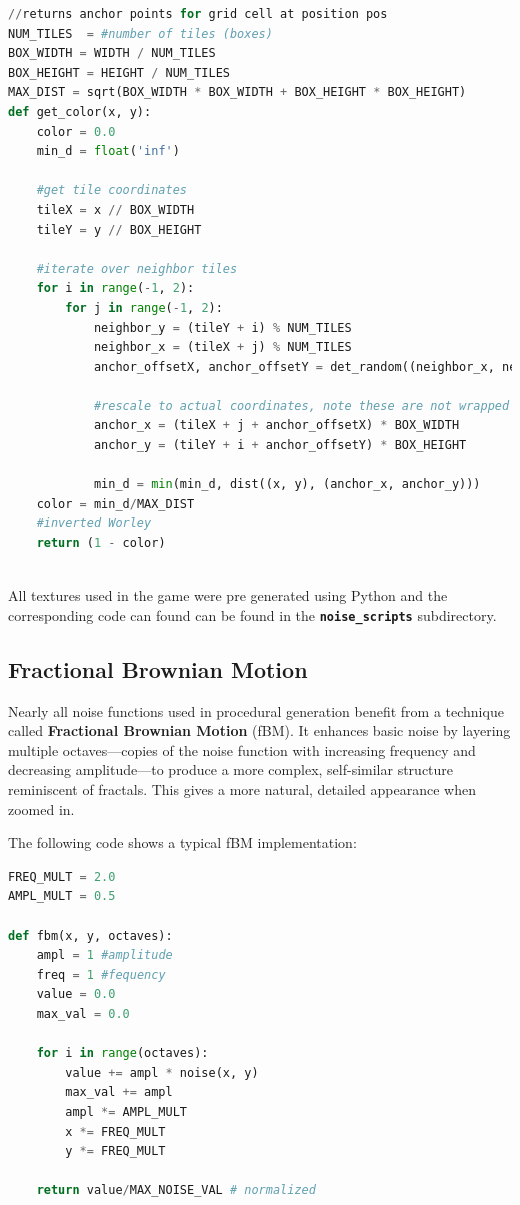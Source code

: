 \begin{lstlisting}[language=Python]
//returns anchor points for grid cell at position pos
NUM_TILES  = #number of tiles (boxes)
BOX_WIDTH = WIDTH / NUM_TILES
BOX_HEIGHT = HEIGHT / NUM_TILES
MAX_DIST = sqrt(BOX_WIDTH * BOX_WIDTH + BOX_HEIGHT * BOX_HEIGHT)
def get_color(x, y):
	color = 0.0
	min_d = float('inf')

	#get tile coordinates
	tileX = x // BOX_WIDTH 
	tileY = y // BOX_HEIGHT

	#iterate over neighbor tiles
	for i in range(-1, 2):
		for j in range(-1, 2):
			neighbor_y = (tileY + i) % NUM_TILES 
			neighbor_x = (tileX + j) % NUM_TILES
			anchor_offsetX, anchor_offsetY = det_random((neighbor_x, neighbor_y))

			#rescale to actual coordinates, note these are not wrapped
			anchor_x = (tileX + j + anchor_offsetX) * BOX_WIDTH
			anchor_y = (tileY + i + anchor_offsetY) * BOX_HEIGHT

			min_d = min(min_d, dist((x, y), (anchor_x, anchor_y)))
	color = min_d/MAX_DIST
	#inverted Worley
	return (1 - color)
			
\end{lstlisting}

All textures used in the game were pre generated using Python and the corresponding code can found can be found in the \textbf{\texttt{noise\_scripts}} subdirectory.
\subsection{Fractional Brownian Motion}
Nearly all noise functions used in procedural generation benefit from a technique called \textbf{Fractional Brownian Motion} (fBM). It enhances basic noise by layering multiple octaves—copies of the noise function with increasing frequency and decreasing amplitude—to produce a more complex, self-similar structure reminiscent of fractals. This gives a more natural, detailed appearance when zoomed in.

The following code shows a typical fBM implementation:

\begin{lstlisting}[language=Python]
FREQ_MULT = 2.0
AMPL_MULT = 0.5

def fbm(x, y, octaves):
	ampl = 1 #amplitude
    freq = 1 #fequency
    value = 0.0
    max_val = 0.0
    
    for i in range(octaves):
        value += ampl * noise(x, y)
        max_val += ampl 
        ampl *= AMPL_MULT
        x *= FREQ_MULT
        y *= FREQ_MULT
    
    return value/MAX_NOISE_VAL # normalized
			
\end{lstlisting}

